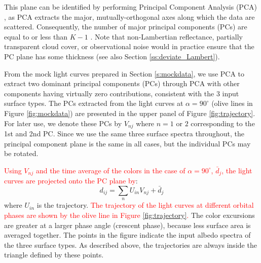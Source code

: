 \documentclass[iop,numberedappendix,apj]{emulateapj}
\def\edit#1{\textcolor{red}{#1}}
\begin{document}
This plane can be identified by performing Principal Component Analysis (PCA) \citep{Cowan2009,Cowan2011}, as PCA extracts the major, mutually-orthogonal axes along which the data are scattered. 
Consequently, the number of major principal components (PCs) are equal to or less than $K-1$ \citep{Cowan2011}. 
Note that non-Lambertian reflectance, partially transparent cloud cover, or observational noise would in practice ensure that the PC plane has some thickness (see also Section \ref{ss:deviate_Lambert}). 

From the mock light curves prepared in Section \ref{s:mockdata}, 
we use PCA to extract two dominant principal components (PCs) through PCA with other components having virtually zero contributions, consistent with the 3 input surface types.  
The PCs extracted from the light curves at $\alpha = 90^{\circ }$ (olive lines in Figure \ref{fig:mockdata}) are presented in the upper panel of Figure \ref{fig:trajectory}. 
For later use, we denote these PCs by $V_{nj}$ where $n=1$ or $2$  corresponding to the 1st and 2nd PC. 
Since we use the same three surface spectra throughout, the principal component plane is the same in all cases, but the individual PCs may be rotated. 

\edit{Using $V_{nj}$ and the time average of the colors in the case of $\alpha = 90^{\circ }$, $\bar d_j$, the light curves are projected onto the PC plane by}:
\begin{equation}
d_{ij} = \sum_n U_{in} V_{nj} + \bar d_j
\end{equation}
where $U_{in}$ is the trajectory. %
\edit{The trajectory of the light curves at different orbital phases are shown by the olive line in Figure \ref{fig:trajectory}. }
The color excursions are greater at a larger phase angle (crescent phase), because less surface area is averaged together.  
The points in the figure indicate the input albedo spectra of the three surface types. 
As described above, the trajectories are always inside the triangle defined by these points. 
 
\end{document}
